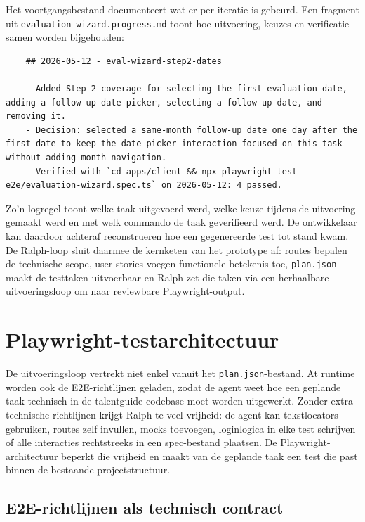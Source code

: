 Het voortgangsbestand documenteert wat er per iteratie is gebeurd. Een fragment uit \texttt{evaluation-wizard.progress.md} toont hoe uitvoering, keuzes en verificatie samen worden bijgehouden:

\begin{verbatim}
    ## 2026-05-12 - eval-wizard-step2-dates
    
    - Added Step 2 coverage for selecting the first evaluation date, adding a follow-up date picker, selecting a follow-up date, and removing it.
    - Decision: selected a same-month follow-up date one day after the first date to keep the date picker interaction focused on this task without adding month navigation.
    - Verified with `cd apps/client && npx playwright test e2e/evaluation-wizard.spec.ts` on 2026-05-12: 4 passed.
\end{verbatim}

Zo'n logregel toont welke taak uitgevoerd werd, welke keuze tijdens de uitvoering gemaakt werd en met welk commando de taak geverifieerd werd. De ontwikkelaar kan daardoor achteraf reconstrueren hoe een gegenereerde test tot stand kwam. De Ralph-loop sluit daarmee de kernketen van het prototype af: routes bepalen de technische scope, user stories voegen functionele betekenis toe, \texttt{plan.json} maakt de testtaken uitvoerbaar en Ralph zet die taken via een herhaalbare uitvoeringsloop om naar reviewbare Playwright-output.

\section{Playwright-testarchitectuur}

De uitvoeringsloop vertrekt niet enkel vanuit het \texttt{plan.json}-bestand. At runtime worden ook de E2E-richtlijnen geladen, zodat de agent weet hoe een geplande taak technisch in de talentguide-codebase moet worden uitgewerkt. Zonder extra technische richtlijnen krijgt Ralph te veel vrijheid: de agent kan tekstlocators gebruiken, routes zelf invullen, mocks toevoegen, loginlogica in elke test schrijven of alle interacties rechtstreeks in een spec-bestand plaatsen. De Playwright-architectuur beperkt die vrijheid en maakt van de geplande taak een test die past binnen de bestaande projectstructuur.

\subsection{E2E-richtlijnen als technisch contract}


